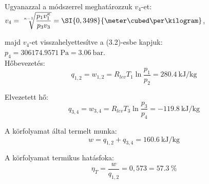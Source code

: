 \par Ugyanazzal a módszerrel meghatározzuk $v_4$-et: 		$v_4=\sqrt[\leftroot{-2}\uproot{2}{\kappa-1}]{\dfrac{p_1v_1^\kappa}{p_3 v_3}}=\SI{0,3498}{\meter\cubed\per\kilogram}$,\\

\par majd $v_4$-et visszahelyettesítve a (3.2)-esbe kapjuk: $p_4=\SI{306174,9571}{\pascal}=\SI{3,06}{\bar}$.
\newline\\

\noindent Hőbevezetés:
\begin{equation*}
	q_{1,2}=w_{1,2}=R_{lev}T_1\ln{\dfrac{p_1}{p_2}}=\SI{280,4}{\kilo\joule\per\kilogram}
\end{equation*}

\noindent Elvezetett hő:
\begin{equation*}
	q_{3,4}=w_{3,4}=R_{lev}T_3\ln{\dfrac{p_3}{p_4}}=\SI{-119,8}{\kilo\joule\per\kilogram}
\end{equation*}

\noindent A körfolyamat által termelt munka:
\begin{equation*}
	w=q_{1,2}+q_{3,4}=\SI{160,6}{\kilo\joule\per\kilogram}
\end{equation*}

\noindent A körfolyamat termikus hatásfoka:
\begin{equation*}
	\eta_T=\dfrac{w}{q_{1,2}}=\si{0,573}=\SI{57,3}{\%}
\end{equation*}

